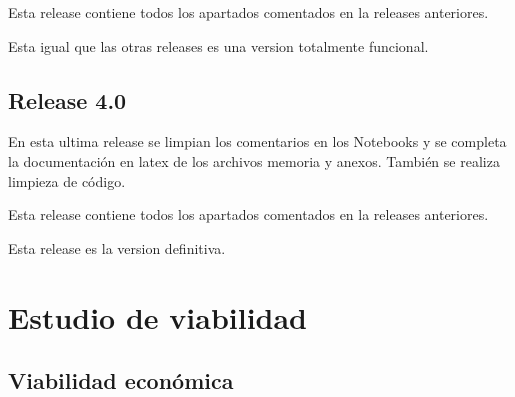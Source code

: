 Esta release contiene todos los apartados comentados en la releases anteriores.

Esta igual que las otras releases es una version totalmente funcional.


\subsection{Release 4.0}

En esta ultima release se limpian los comentarios en los Notebooks y se completa la documentación en latex de los archivos memoria y anexos. También se realiza limpieza de código.

Esta release contiene todos los apartados comentados en la releases anteriores.

Esta release es la version definitiva.

\section{Estudio de viabilidad}


\subsection{Viabilidad económica}


